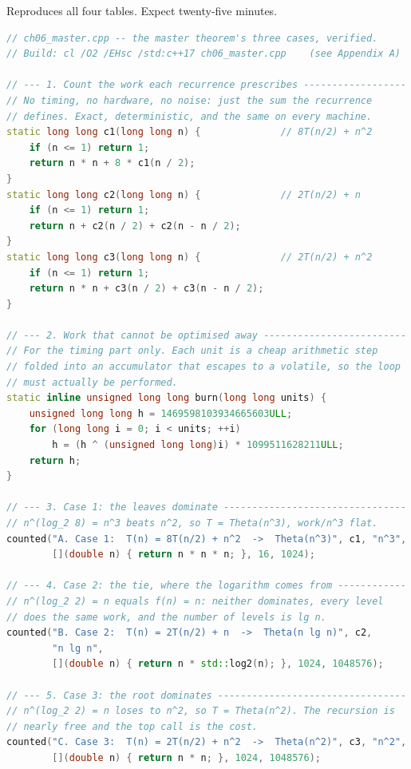 \begin{lab}
Reproduces all four tables. Expect twenty-five minutes.

\begin{lstlisting}[language=C++]
// ch06_master.cpp -- the master theorem's three cases, verified.
// Build: cl /O2 /EHsc /std:c++17 ch06_master.cpp    (see Appendix A)

// --- 1. Count the work each recurrence prescribes ------------------
// No timing, no hardware, no noise: just the sum the recurrence
// defines. Exact, deterministic, and the same on every machine.
static long long c1(long long n) {              // 8T(n/2) + n^2
    if (n <= 1) return 1;
    return n * n + 8 * c1(n / 2);
}
static long long c2(long long n) {              // 2T(n/2) + n
    if (n <= 1) return 1;
    return n + c2(n / 2) + c2(n - n / 2);
}
static long long c3(long long n) {              // 2T(n/2) + n^2
    if (n <= 1) return 1;
    return n * n + c3(n / 2) + c3(n - n / 2);
}

// --- 2. Work that cannot be optimised away -------------------------
// For the timing part only. Each unit is a cheap arithmetic step
// folded into an accumulator that escapes to a volatile, so the loop
// must actually be performed.
static inline unsigned long long burn(long long units) {
    unsigned long long h = 1469598103934665603ULL;
    for (long long i = 0; i < units; ++i)
        h = (h ^ (unsigned long long)i) * 1099511628211ULL;
    return h;
}

// --- 3. Case 1: the leaves dominate --------------------------------
// n^(log_2 8) = n^3 beats n^2, so T = Theta(n^3), work/n^3 flat.
counted("A. Case 1:  T(n) = 8T(n/2) + n^2  ->  Theta(n^3)", c1, "n^3",
        [](double n) { return n * n * n; }, 16, 1024);

// --- 4. Case 2: the tie, where the logarithm comes from ------------
// n^(log_2 2) = n equals f(n) = n: neither dominates, every level
// does the same work, and the number of levels is lg n.
counted("B. Case 2:  T(n) = 2T(n/2) + n  ->  Theta(n lg n)", c2,
        "n lg n",
        [](double n) { return n * std::log2(n); }, 1024, 1048576);

// --- 5. Case 3: the root dominates ---------------------------------
// n^(log_2 2) = n loses to n^2, so T = Theta(n^2). The recursion is
// nearly free and the top call is the cost.
counted("C. Case 3:  T(n) = 2T(n/2) + n^2  ->  Theta(n^2)", c3, "n^2",
        [](double n) { return n * n; }, 1024, 1048576);


\end{lstlisting}
\end{lab}
